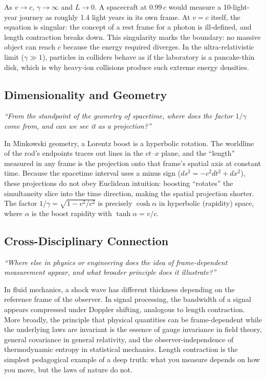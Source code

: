 As $v \to c$, $\gamma \to \infty$ and $L \to 0$. A spacecraft at $0.99\,c$ would measure a 10-light-year journey as roughly 1.4 light years in its own frame. At $v = c$ itself, the equation is singular: the concept of a rest frame for a photon is ill-defined, and length contraction breaks down. This singularity marks the boundary: no massive object can reach $c$ because the energy required diverges. In the ultra-relativistic limit ($\gamma \gg 1$), particles in colliders behave as if the laboratory is a pancake-thin disk, which is why heavy-ion collisions produce such extreme energy densities.

\subsection*{Dimensionality and Geometry}
\textit{``From the standpoint of the geometry of spacetime, where does the factor $1/\gamma$ come from, and can we see it as a projection?''}

In Minkowski geometry, a Lorentz boost is a hyperbolic rotation. The worldline of the rod's endpoints traces out lines in the $ct$--$x$ plane, and the ``length'' measured in any frame is the projection onto that frame's spatial axis at constant time. Because the spacetime interval uses a minus sign ($ds^{2} = -c^{2}dt^{2} + dx^{2}$), these projections do not obey Euclidean intuition: boosting ``rotates'' the simultaneity slice into the time direction, making the spatial projection shorter. The factor $1/\gamma = \sqrt{1 - v^{2}/c^{2}}$ is precisely $\cosh\alpha$ in hyperbolic (rapidity) space, where $\alpha$ is the boost rapidity with $\tanh\alpha = v/c$.

\subsection*{Cross-Disciplinary Connection}
\textit{``Where else in physics or engineering does the idea of frame-dependent measurement appear, and what broader principle does it illustrate?''}

In fluid mechanics, a shock wave has different thickness depending on the reference frame of the observer. In signal processing, the bandwidth of a signal appears compressed under Doppler shifting, analogous to length contraction. More broadly, the principle that physical quantities can be frame-dependent while the underlying laws are invariant is the essence of gauge invariance in field theory, general covariance in general relativity, and the observer-independence of thermodynamic entropy in statistical mechanics. Length contraction is the simplest pedagogical example of a deep truth: what you measure depends on how you move, but the laws of nature do not.

